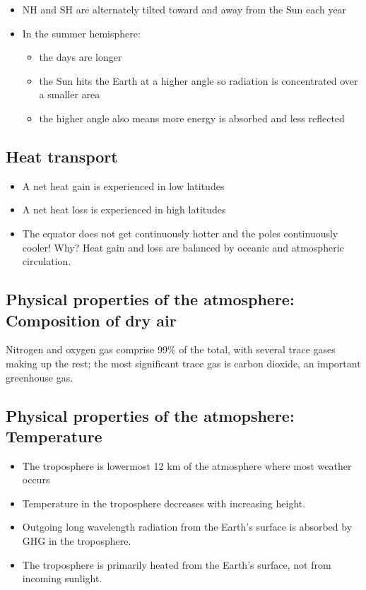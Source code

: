 \begin{itemize}
    \item NH and SH are alternately tilted toward and away from the Sun
        each year
    \item In the summer hemisphere:
        \begin{itemize}
            \item the days are longer
            \item the Sun hits the Earth at a higher angle so radiation is
                concentrated over a smaller area
            \item the higher angle also means more energy is absorbed and less
                reflected
        \end{itemize}
\end{itemize}

\subsection{Heat transport}

\begin{itemize}
    \item A net heat gain is experienced in low latitudes
    \item A net heat loss is experienced in high latitudes
    \item The equator does not get continuously hotter and the poles
        continuously cooler! Why? Heat gain and loss are balanced by oceanic
        and atmospheric circulation.
\end{itemize}

\subsection{Physical properties of the atmosphere: Composition of dry air}

Nitrogen and oxygen gas comprise 99\% of the total, with several trace gases
making up the rest; the most significant trace gas is carbon dioxide, an
important greenhouse gas.

\subsection{Physical properties of the atmopshere: Temperature}

\begin{itemize}
    \item The troposphere is lowermost 12 km of the atmosphere where most
        weather occurs
    \item Temperature in the troposphere decreases with increasing height.
    \item Outgoing long wavelength radiation from the Earth's surface
        is absorbed by GHG in the troposphere.
    \item The troposphere is primarily heated from the Earth's surface,
        not from incoming sunlight.
\end{itemize}

